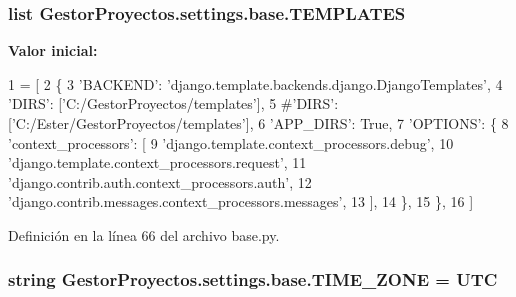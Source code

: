 \subsubsection[{\texorpdfstring{T\+E\+M\+P\+L\+A\+T\+ES}{TEMPLATES}}]{\setlength{\rightskip}{0pt plus 5cm}list Gestor\+Proyectos.\+settings.\+base.\+T\+E\+M\+P\+L\+A\+T\+ES}\hypertarget{namespace_gestor_proyectos_1_1settings_1_1base_a07d8c3b5090da69059a7167c68117e81}{}\label{namespace_gestor_proyectos_1_1settings_1_1base_a07d8c3b5090da69059a7167c68117e81}
{\bfseries Valor inicial\+:}
\begin{DoxyCode}
1 = [
2     \{
3         \textcolor{stringliteral}{'BACKEND'}: \textcolor{stringliteral}{'django.template.backends.django.DjangoTemplates'},
4         \textcolor{stringliteral}{'DIRS'}: [\textcolor{stringliteral}{'C:/GestorProyectos/templates'}],
5         \textcolor{comment}{#'DIRS': ['C:/Ester/GestorProyectos/templates'],}
6         \textcolor{stringliteral}{'APP\_DIRS'}: \textcolor{keyword}{True},
7         \textcolor{stringliteral}{'OPTIONS'}: \{
8             \textcolor{stringliteral}{'context\_processors'}: [
9                 \textcolor{stringliteral}{'django.template.context\_processors.debug'},
10                 \textcolor{stringliteral}{'django.template.context\_processors.request'},
11                 \textcolor{stringliteral}{'django.contrib.auth.context\_processors.auth'},
12                 \textcolor{stringliteral}{'django.contrib.messages.context\_processors.messages'},
13             ],
14         \},
15     \},
16 ]
\end{DoxyCode}


Definición en la línea 66 del archivo base.\+py.

\subsubsection[{\texorpdfstring{T\+I\+M\+E\+\_\+\+Z\+O\+NE}{TIME_ZONE}}]{\setlength{\rightskip}{0pt plus 5cm}string Gestor\+Proyectos.\+settings.\+base.\+T\+I\+M\+E\+\_\+\+Z\+O\+NE = \textquotesingle{}U\+TC\textquotesingle{}}\hypertarget{namespace_gestor_proyectos_1_1settings_1_1base_a10f7aed2be6a1ec9fb8bedb6c5eebd83}{}\label{namespace_gestor_proyectos_1_1settings_1_1base_a10f7aed2be6a1ec9fb8bedb6c5eebd83}


